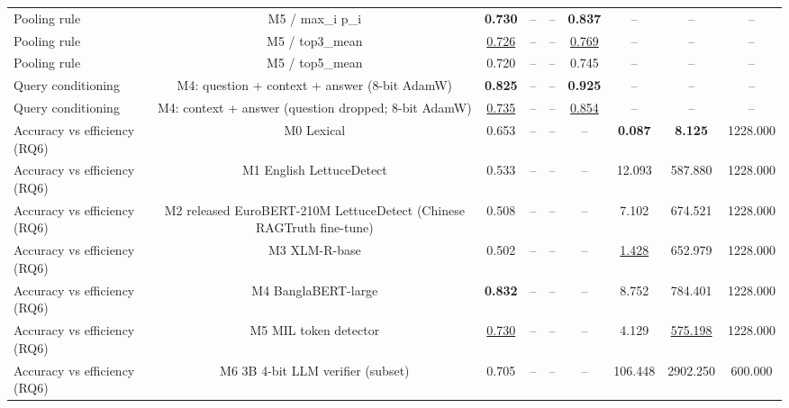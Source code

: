 \begin{table}[t]
{\begin{tabular}{lcccccccc}
Pooling rule & M5 / max\_i p\_i & \textbf{0.730} & -- & -- & \textbf{0.837} & -- & -- & -- \\
Pooling rule & M5 / top3\_mean & \underline{0.726} & -- & -- & \underline{0.769} & -- & -- & -- \\
Pooling rule & M5 / top5\_mean & 0.720 & -- & -- & 0.745 & -- & -- & -- \\
\midrule
Query conditioning & M4: question + context + answer (8-bit AdamW) & \textbf{0.825} & -- & -- & \textbf{0.925} & -- & -- & -- \\
Query conditioning & M4: context + answer (question dropped; 8-bit AdamW) & \underline{0.735} & -- & -- & \underline{0.854} & -- & -- & -- \\
\midrule
Accuracy vs efficiency (RQ6) & M0 Lexical & 0.653 & -- & -- & -- & \textbf{0.087} & \textbf{8.125} & 1228.000 \\
Accuracy vs efficiency (RQ6) & M1 English LettuceDetect & 0.533 & -- & -- & -- & 12.093 & 587.880 & 1228.000 \\
Accuracy vs efficiency (RQ6) & M2 released EuroBERT-210M LettuceDetect (Chinese RAGTruth fine-tune) & 0.508 & -- & -- & -- & 7.102 & 674.521 & 1228.000 \\
Accuracy vs efficiency (RQ6) & M3 XLM-R-base & 0.502 & -- & -- & -- & \underline{1.428} & 652.979 & 1228.000 \\
Accuracy vs efficiency (RQ6) & M4 BanglaBERT-large & \textbf{0.832} & -- & -- & -- & 8.752 & 784.401 & 1228.000 \\
Accuracy vs efficiency (RQ6) & M5 MIL token detector & \underline{0.730} & -- & -- & -- & 4.129 & \underline{575.198} & 1228.000 \\
Accuracy vs efficiency (RQ6) & M6 3B 4-bit LLM verifier (subset) & 0.705 & -- & -- & -- & 106.448 & 2902.250 & 600.000 \\
\bottomrule
\end{tabular}}
\end{table}